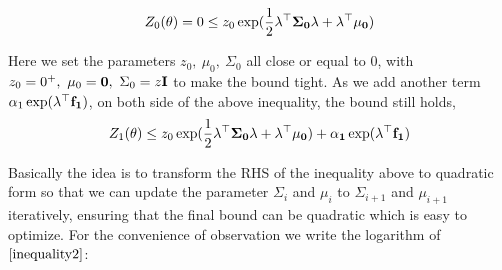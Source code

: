 \documentclass{article}
\begin{document}
\begin{equation}
  \begin{aligned}
   Z_{0}(\theta ) = 0 \leq z_0 \exp(\frac{1}{2} \bf{\lambda}^{\top} \Sigma_0 \lambda + \lambda^{\top} \bf{\mu}_0) 
  \end{aligned}
 \end{equation} 

 Here we set the parameters $z_0,\ \mu_0,\ \Sigma_0$ all close or equal to 0, with $z_0 = 0^{+},\ \mu_0 = \textbf{0},\ \Sigma_0 = z\bf{I}$ to make the bound tight.
 As we add another term $\alpha_1 \exp(\lambda^{\top} \bf{f}_1)$, on both side of the above inequality, the bound still holds, 
 \begin{equation}
  \begin{aligned}
   Z_{1}(\theta ) \leq z_0 \exp(\frac{1}{2} \bf{\lambda}^{\top} \Sigma_0 \lambda + \lambda^{\top} \mu_0) + \alpha_1 \exp(\lambda^{\top}\bf{f}_1) 
   \label{inequality2}
  \end{aligned}
 \end{equation} 

 Basically the idea is to transform the RHS of the inequality above to quadratic form so that 
 we can update the parameter $\Sigma_i$ and $\mu_i$ to $\Sigma_{i+1}$ and $\mu_{i+1}$ iteratively, ensuring that the final bound can be quadratic which is easy to optimize.
 For the convenience of observation we write the logarithm of $\ref{inequality2}$:
\end{document}
